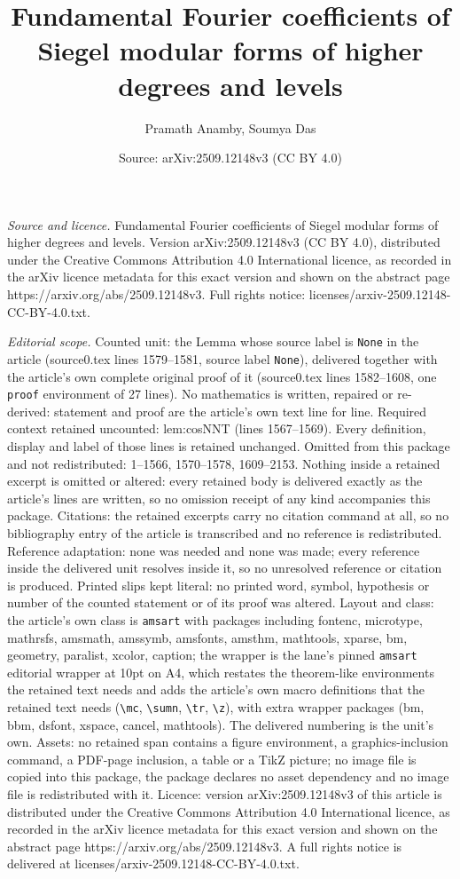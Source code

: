 \documentclass[10pt,a4paper]{amsart}
\title[Fundamental Fourier coefficients of Siegel modular forms of ]{Fundamental Fourier coefficients of Siegel modular forms of higher degrees and levels}
\author{Pramath Anamby, Soumya Das}
\date{Source: arXiv:2509.12148v3 (CC BY 4.0)}
\begin{document}
\maketitle

\noindent\emph{Source and licence.} Fundamental Fourier coefficients of Siegel modular forms of higher degrees and levels. Version arXiv:2509.12148v3 (CC BY 4.0), distributed under the Creative Commons Attribution 4.0 International licence, as recorded in the arXiv licence metadata for this exact version and shown on the abstract page https://arxiv.org/abs/2509.12148v3. Full rights notice: licenses/arxiv-2509.12148-CC-BY-4.0.txt.\par\smallskip

\noindent\textit{Editorial scope.} Counted unit: the Lemma whose source label is \texttt{None} in the article (source0.tex lines 1579--1581, source label \texttt{None}), delivered together with the article's own complete original proof of it (source0.tex lines 1582--1608, one \texttt{proof} environment of 27 lines). No mathematics is written, repaired or re-derived: statement and proof are the article's own text line for line. Required context retained uncounted: lem:cosNNT (lines 1567--1569). Every definition, display and label of those lines is retained unchanged. Omitted from this package and not redistributed: 1--1566, 1570--1578, 1609--2153. Nothing inside a retained excerpt is omitted or altered: every retained body is delivered exactly as the article's lines are written, so no omission receipt of any kind accompanies this package. Citations: the retained excerpts carry no citation command at all, so no bibliography entry of the article is transcribed and no reference is redistributed. Reference adaptation: none was needed and none was made; every reference inside the delivered unit resolves inside it, so no unresolved reference or citation is produced. Printed slips kept literal: no printed word, symbol, hypothesis or number of the counted statement or of its proof was altered. Layout and class: the article's own class is \texttt{amsart} with packages including fontenc, microtype, mathrsfs, amsmath, amssymb, amsfonts, amsthm, mathtools, xparse, bm, geometry, paralist, xcolor, caption; the wrapper is the lane's pinned \texttt{amsart} editorial wrapper at 10pt on A4, which restates the theorem-like environments the retained text needs and adds the article's own macro definitions that the retained text needs (\texttt{\textbackslash mc}, \texttt{\textbackslash sumn}, \texttt{\textbackslash tr}, \texttt{\textbackslash z}), with extra wrapper packages (bm, bbm, dsfont, xspace, cancel, mathtools). The delivered numbering is the unit's own. Assets: no retained span contains a figure environment, a graphics-inclusion command, a PDF-page inclusion, a table or a TikZ picture; no image file is copied into this package, the package declares no asset dependency and no image file is redistributed with it. Licence: version arXiv:2509.12148v3 of this article is distributed under the Creative Commons Attribution 4.0 International licence, as recorded in the arXiv licence metadata for this exact version and shown on the abstract page https://arxiv.org/abs/2509.12148v3. A full rights notice is delivered at licenses/arxiv-2509.12148-CC-BY-4.0.txt. 
\end{document}
